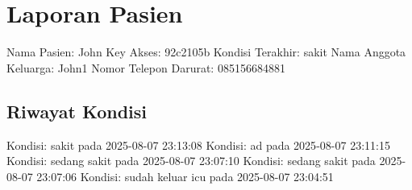 \documentclass{article}%
\begin{document}
%
\normalsize%
\section{Laporan Pasien}%
\label{sec:LaporanPasien}%
Nama Pasien: John%
\newline%
Key Akses: 92c2105b%
\newline%
Kondisi Terakhir: sakit%
\newline%
Nama Anggota Keluarga: John1%
\newline%
Nomor Telepon Darurat: 085156684881%
\subsection{Riwayat Kondisi}%
\label{subsec:RiwayatKondisi}%
Kondisi: sakit pada 2025{-}08{-}07 23:13:08%
\newline%
Kondisi: ad pada 2025{-}08{-}07 23:11:15%
\newline%
Kondisi: sedang sakit pada 2025{-}08{-}07 23:07:10%
\newline%
Kondisi: sedang sakit pada 2025{-}08{-}07 23:07:06%
\newline%
Kondisi: sudah keluar icu pada 2025{-}08{-}07 23:04:51%
\newline

%
\end{document}

